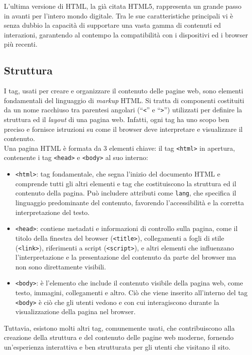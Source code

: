 L’ultima versione di HTML, la già citata HTML5, rappresenta un grande passo in avanti per l’intero mondo digitale. Tra le sue caratteristiche principali vi è senza dubbio la capacità di supportare una vasta gamma di contenuti ed interazioni, garantendo al contempo la compatibilità con i dispositivi ed i browser più recenti.

\subsection{Struttura}

I tag, usati per creare e organizzare il contenuto delle pagine web, sono elementi fondamentali del linguaggio di \textit{markup} HTML. Si tratta di componenti costituiti da un nome racchiuso tra parentesi angolari (“\texttt{<}” e “\texttt{>}”) utilizzati per definire la struttura ed il \textit{layout} di una pagina web. Infatti, ogni tag ha uno scopo ben preciso e fornisce istruzioni su come il browser deve interpretare e visualizzare il contenuto.\\
Una pagina HTML è formata da 3 elementi chiave: il tag \texttt{<html>} in apertura, contenente i tag \texttt{<head>} e \texttt{<body>} al suo interno:
\begin{itemize}
    \item \texttt{<html>}: tag fondamentale, che segna l’inizio del documento HTML e comprende tutti gli altri elementi e tag che costituiscono la struttura ed il contenuto della pagina. Può includere attributi come \texttt{lang}, che specifica il linguaggio predominante del contenuto, favorendo l’accessibilità e la corretta interpretazione del testo.
    \item \texttt{<head>}: contiene metadati e informazioni di controllo sulla pagina, come il titolo della finestra del browser (\texttt{<title>}), collegamenti a fogli di stile (\texttt{<link>}), riferimenti a script (\texttt{<script>}),\cite{HTML_tagmanageritalia} e altri elementi che influenzano l’interpretazione e la presentazione del contenuto da parte del browser ma non sono direttamente visibili.
    \item \texttt{<body>}: è l’elemento che include il contenuto visibile della pagina web, come testo, immagini, collegamenti e altro.\cite{HTML_kinsta} Ciò che viene inserito all’interno del tag \texttt{<body>} è ciò che gli utenti vedono e con cui interagiscono durante la visualizzazione della pagina nel browser.\cite{HTML_tagmanageritalia}
\end{itemize}
Tuttavia, esistono molti altri tag, comunemente usati, che contribuiscono alla creazione della struttura e del contenuto delle pagine web moderne, fornendo un’esperienza interattiva e ben strutturata per gli utenti che visitano il sito.

